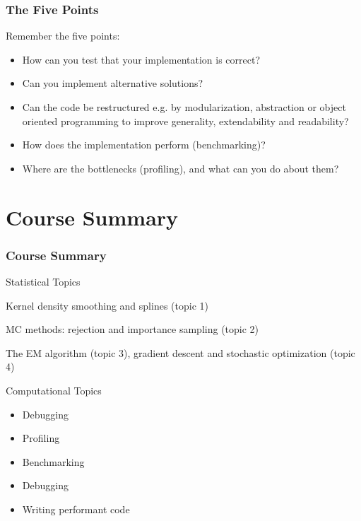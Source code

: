 \documentclass[aspectratio=1610,onlytextwidth]{beamer}
\begin{document}
\begin{frame}[c]
  \frametitle{The Five Points}

  Remember the five points:
  \begin{itemize}
    \item How can you test that your implementation is correct?
    \item Can you implement alternative solutions?
    \item Can the code be restructured e.g. by modularization, abstraction or object oriented programming to improve generality, extendability and readability?
    \item How does the implementation perform (benchmarking)?
    \item Where are the bottlenecks (profiling), and what can you do about them?
  \end{itemize}


\end{frame}

\section{Course Summary}

\begin{frame}[c]
  \frametitle{Course Summary}

  \begin{block}{Statistical Topics}
    \begin{description}[<+->][Optimization]
      \item[Smoothing] Kernel density smoothing and splines (topic 1)
      \item[Simulation] MC methods: rejection and importance sampling (topic 2)
      \item[Optimization] The EM algorithm (topic 3), gradient descent and stochastic optimization (topic 4)
    \end{description}
  \end{block}

  \pause

  \begin{block}{Computational Topics}
    \begin{itemize}
      \item Debugging
      \item Profiling
      \item Benchmarking
      \item Debugging
      \item Writing performant code
    \end{itemize}
  \end{block}
\end{frame}

\appendix

\end{document}

